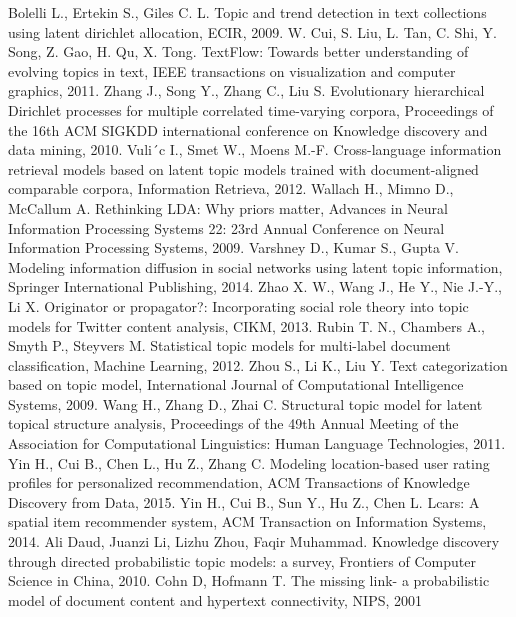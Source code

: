 \documentclass[12pt]{article}
\begin{document}
\begin{thebibliography}{@@@@}
		Bolelli L., Ertekin S., Giles C. L. Topic and trend detection in text collections using latent dirichlet allocation, ECIR, 2009.
		W. Cui, S. Liu, L. Tan, C. Shi, Y. Song, Z. Gao, H. Qu, X. Tong. TextFlow: Towards better understanding of evolving topics in text, IEEE transactions on visualization and computer graphics, 2011.
		Zhang J., Song Y., Zhang C., Liu S. Evolutionary hierarchical Dirichlet processes for multiple correlated time-varying corpora, Proceedings of the 16th ACM SIGKDD international conference on Knowledge discovery and data mining, 2010.
		Vuli´c I., Smet W., Moens M.-F. Cross-language information retrieval models based on latent topic models trained with document-aligned comparable corpora, Information Retrieva, 2012.
		 Wallach H., Mimno D., McCallum A. Rethinking LDA: Why priors matter, Advances in Neural Information Processing Systems 22: 23rd Annual Conference on Neural Information Processing Systems, 2009.
		Varshney D., Kumar S., Gupta V. Modeling information diffusion in social networks using latent topic information,  Springer International Publishing, 2014.
		Zhao X. W., Wang J., He Y., Nie J.-Y., Li X. Originator or propagator?: Incorporating social role
theory into topic models for Twitter content analysis, CIKM, 2013.
		Rubin T. N., Chambers A., Smyth P., Steyvers M. Statistical topic models for multi-label document classification, Machine Learning, 2012.
		Zhou S., Li K., Liu Y. Text categorization based on topic model, International Journal of Computational Intelligence Systems,  2009.
		Wang H., Zhang D., Zhai C. Structural topic model for latent topical structure analysis, Proceedings of the 49th Annual Meeting of the Association for Computational Linguistics: Human Language Technologies, 2011.
		Yin H., Cui B., Chen L., Hu Z., Zhang C. Modeling location-based user rating profiles for personalized recommendation, ACM Transactions of Knowledge Discovery from Data, 2015.
		Yin H., Cui B., Sun Y., Hu Z., Chen L. Lcars: A spatial item recommender system, ACM Transaction on Information Systems,  2014.
		Ali Daud, Juanzi Li, Lizhu Zhou, Faqir Muhammad. Knowledge discovery through directed probabilistic topic models: a survey, Frontiers of Computer Science in China, 2010.
		 Cohn D, Hofmann T. The missing link- a probabilistic model of document content and hypertext connectivity, NIPS, 2001

\end{thebibliography}
\end{document}
